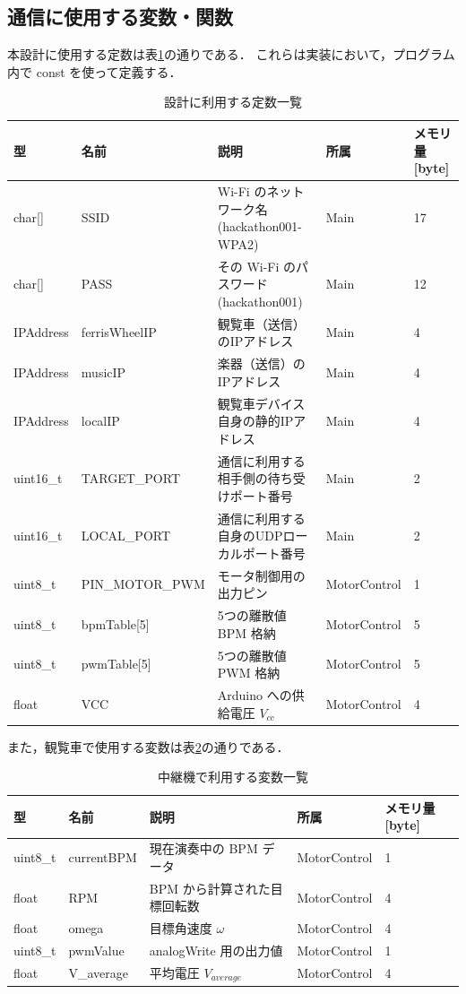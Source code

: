 \documentclass[lualatex,book,paper=a4paper,jafontsize=11.5pt,jafontscale=1.05]{jlreq}
\begin{document}
\subsection{通信に使用する変数・関数}
本設計に使用する定数は表\ref{tab:teisuu}の通りである．
これらは実装において，プログラム内で const を使って定義する．
\begin{table}[H]
    \centering
    \caption{設計に利用する定数一覧}
    \label{tab:teisuu}
    {\small
    \begin{tabular}{llp{5cm}ll} \hline
    \textbf{型} & \textbf{名前} & \textbf{説明} & \textbf{所属} & \textbf{メモリ量 [byte]} \\ \hline
    char[] & SSID & Wi-Fi のネットワーク名(hackathon001-WPA2) & Main & 17 \\ \hline
    char[] & PASS & その Wi-Fi のパスワード(hackathon001) & Main & 12 \\ \hline
    IPAddress & ferrisWheelIP & 観覧車（送信）のIPアドレス & Main & 4 \\ \hline
    IPAddress & musicIP & 楽器（送信）のIPアドレス & Main & 4 \\ \hline
    IPAddress & localIP & 観覧車デバイス自身の静的IPアドレス & Main & 4 \\ \hline
    uint16\_t & TARGET\_PORT & 通信に利用する相手側の待ち受けポート番号 & Main & 2 \\ \hline
    uint16\_t & LOCAL\_PORT & 通信に利用する自身のUDPローカルポート番号 & Main & 2 \\ \hline
    uint8\_t & PIN\_MOTOR\_PWM & モータ制御用の出力ピン & MotorControl & 1 \\ \hline
    uint8\_t & bpmTable[5] & 5つの離散値 BPM 格納 & MotorControl & 5 \\ \hline
    uint8\_t & pwmTable[5] & 5つの離散値 PWM 格納 & MotorControl & 5 \\ \hline
    float & VCC & Arduino への供給電圧 $V_{cc}$ & MotorControl & 4 \\ \hline
    \end{tabular}
    }
\end{table}

また，観覧車で使用する変数は表\ref{tab:hensuu1}の通りである．
\begin{table}[H]
    \centering
    \caption{中継機で利用する変数一覧}
    \label{tab:hensuu1}
    \begin{tabular}{llp{6cm}ll} \hline
    \textbf{型} & \textbf{名前} & \textbf{説明} & \textbf{所属} & \textbf{メモリ量 [byte]} \\ \hline
    uint8\_t & currentBPM & 現在演奏中の BPM データ & MotorControl & 1 \\ \hline
    float & RPM & BPM から計算された目標回転数 & MotorControl & 4 \\ \hline
    float & omega & 目標角速度 $\omega$ & MotorControl & 4 \\ \hline
    uint8\_t & pwmValue & analogWrite 用の出力値 & MotorControl & 1 \\ \hline
    float & V\_average & 平均電圧 $V_{average}$ & MotorControl & 4 \\ \hline
    \end{tabular}
\end{table}
\end{document}
